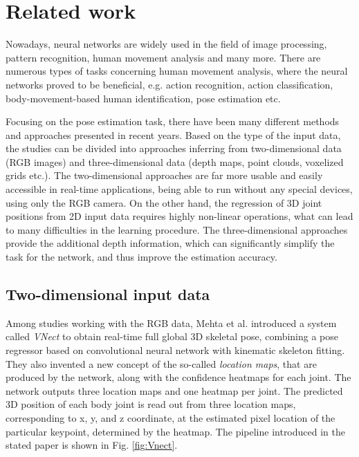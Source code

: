 
\chapter{Related work}\label{chap:related work}

Nowadays, neural networks are widely used in the field of image processing, pattern recognition, human movement analysis and many more. There are numerous types of tasks concerning human movement analysis, where the neural networks proved to be beneficial, e.g. action recognition, action classification, body-movement-based human identification, pose estimation etc.\par
\vspace{5mm}
\noindent Focusing on the pose estimation task, there have been many different methods and approaches presented in recent years. Based on the type of the input data, the studies can be divided into approaches inferring from two-dimensional data (RGB images) and three-dimensional data (depth maps, point clouds, voxelized grids etc.). The two-dimensional approaches are far more usable and easily accessible in real-time applications, being able to run without any special devices, using only the RGB camera. On the other hand, the regression of 3D joint positions from 2D input data requires highly non-linear operations, what can lead to many difficulties in the learning procedure. The three-dimensional approaches provide the additional depth information, which can significantly simplify the task for the network, and thus improve the estimation accuracy.

\section{Two-dimensional input data}
\noindent Among studies working with the RGB data, Mehta et al. \cite{VNect_SIGGRAPH2017} introduced a system called \textit{VNect} to obtain real-time full global 3D skeletal pose, combining a pose regressor based on convolutional neural network with kinematic skeleton fitting. They also invented a new concept of the so-called \textit{location maps}, that are produced by the network, along with the confidence heatmaps for each joint. The network outputs three location maps and one heatmap per joint. The predicted 3D position of each body joint is read out from three location maps, corresponding to x, y, and z coordinate, at the estimated pixel location of the particular keypoint, determined by the heatmap. The pipeline introduced in the stated paper is shown in Fig. \ref{fig:Vnect}.\par

